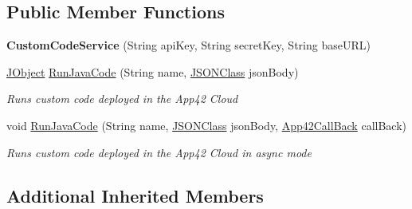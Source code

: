 \subsection*{Public Member Functions}
\begin{DoxyCompactItemize}
\item 
\hypertarget{classcom_1_1shephertz_1_1app42_1_1paas_1_1sdk_1_1csharp_1_1customcode_1_1_custom_code_service_a3c88e9055613b95f97b189705c74d50d}{{\bfseries Custom\+Code\+Service} (String api\+Key, String secret\+Key, String base\+U\+R\+L)}\label{classcom_1_1shephertz_1_1app42_1_1paas_1_1sdk_1_1csharp_1_1customcode_1_1_custom_code_service_a3c88e9055613b95f97b189705c74d50d}

\item 
\hyperlink{class_simple_j_s_o_n_1_1_j_object}{J\+Object} \hyperlink{classcom_1_1shephertz_1_1app42_1_1paas_1_1sdk_1_1csharp_1_1customcode_1_1_custom_code_service_a6cc76966bb508c78e9090db2d735a93f}{Run\+Java\+Code} (String name, \hyperlink{class_simple_j_s_o_n_1_1_j_s_o_n_class}{J\+S\+O\+N\+Class} json\+Body)
\begin{DoxyCompactList}\small\item\em Runs custom code deployed in the App42 Cloud \end{DoxyCompactList}\item 
void \hyperlink{classcom_1_1shephertz_1_1app42_1_1paas_1_1sdk_1_1csharp_1_1customcode_1_1_custom_code_service_a50dc52f2f3acba9ce32f6a1e3c498ba3}{Run\+Java\+Code} (String name, \hyperlink{class_simple_j_s_o_n_1_1_j_s_o_n_class}{J\+S\+O\+N\+Class} json\+Body, \hyperlink{interfacecom_1_1shephertz_1_1app42_1_1paas_1_1sdk_1_1csharp_1_1_app42_call_back}{App42\+Call\+Back} call\+Back)
\begin{DoxyCompactList}\small\item\em Runs custom code deployed in the App42 Cloud in async mode \end{DoxyCompactList}\end{DoxyCompactItemize}
\subsection*{Additional Inherited Members}


